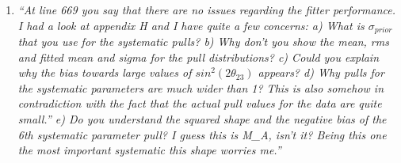 \begin{enumerate}
If a fit fails, then the fitter is re-initialised as described in Sec.\ 4.1.5.

\vspace{5 mm}
\item
{\em
  ``At line 669 you say that there are no issues regarding the fitter performance. 
    I had a look at appendix H and I have quite a few concerns:
    a) What is $\sigma_{prior}$ that you use for the systematic pulls?
    b) Why don't you show the mean, rms and fitted mean and sigma for the pull distributions?
    c) Could you explain why the bias towards large values of $sin^{2}(2\theta_{23})$ appears?
    d) Why pulls for the systematic parameters are much wider than 1?  
       This is also somehow in contradiction with the fact that the actual pull values for the data are quite small.''
    e) Do you understand the squared shape and the negative bias of the 6th systematic parameter pull? 
       I guess this is M\_A, isn't it? Being this one the most important systematic this shape worries me.''
}\\
\\


\end{enumerate}
